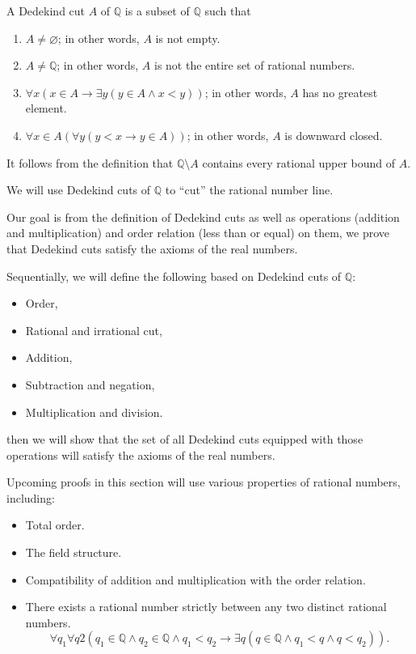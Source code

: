 \begin{definition}
    A Dedekind cut $A$ of $\mathbb{Q}$ is a subset of $\mathbb{Q}$ such that
    \begin{enumerate}[label = (DC\arabic*),itemindent=0.3cm]
        \item $A\ne\varnothing$; in other words, $A$ is not empty.
        \item $A\neq\mathbb{Q}$; in other words, $A$ is not the entire set of rational numbers.
        \item $\forall x\left(x\in A \rightarrow \exists y \left( y\in A \wedge x < y \right)\right)$; in other words, $A$ has no greatest element.
        \item $\forall x\in A\left(\forall y( y < x \rightarrow y\in A)\right)$; in other words, $A$ is downward closed.
    \end{enumerate}
\end{definition}

It follows from the definition that $\mathbb{Q}\setminus A$ contains every rational upper bound of $A$.

We will use Dedekind cuts of $\mathbb{Q}$ to ``cut'' the rational number line.

Our goal is from the definition of Dedekind cuts as well as operations (addition and multiplication) and order relation (less than or equal) on them, we prove that Dedekind cuts satisfy the axioms of the real numbers.

Sequentially, we will define the following based on Dedekind cuts of $\mathbb{Q}$:
\begin{itemize}[itemsep=0pt]
    \item Order,
    \item Rational and irrational cut,
    \item Addition,
    \item Subtraction and negation,
    \item Multiplication and division.
\end{itemize}

then we will show that the set of all Dedekind cuts equipped with those operations will satisfy the axioms of the real numbers.

Upcoming proofs in this section will use various properties of rational numbers, including:
\begin{itemize}[itemsep=0pt]
    \item Total order.
    \item The field structure.
    \item Compatibility of addition and multiplication with the order relation.
    \item There exists a rational number strictly between any two distinct rational numbers.
          \[
              \forall q_{1}\forall q{2}\left( q_{1}\in\mathbb{Q}\land q_{2}\in\mathbb{Q}\land q_{1} < q_{2} \rightarrow \exists q (q\in\mathbb{Q}\land q_{1} < q\land q < q_{2}) \right).
          \]
\end{itemize}

